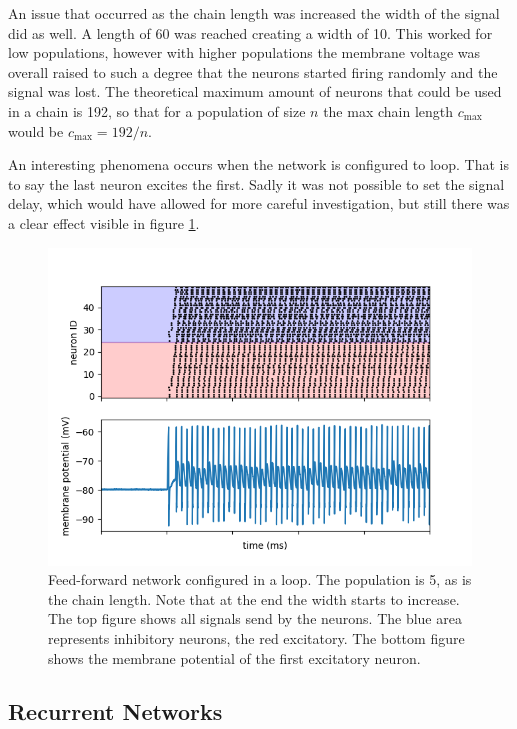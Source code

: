\documentclass[10pt,a4paper]{article}
\begin{document}
An issue that occurred as the chain length was increased the width of the signal
did as well. A length of 60 was reached creating a width of 10. This worked for
low populations, however with higher populations the membrane voltage was
overall raised to such a degree that the neurons started firing randomly and the
signal was lost. The theoretical maximum amount of neurons that could be used in
a chain is 192, so that for a population of size $n$ the max chain length
$c_\text{max}$ would be $c_\text{max} = 192 / n$.

An interesting phenomena occurs when the network is configured to loop. That is
to say the last neuron excites the first. Sadly it was not possible to set the
signal delay, which would have allowed for more careful investigation, but still
there was a clear effect visible in figure \ref{fig:feed-forward-loop}.

\begin{figure}
    \centering
    \includegraphics[width=\textwidth]{figures/feedforward signals loop.png}
    \caption{Feed-forward network configured in a loop. The population is 5, as
        is the chain length. Note that at the end the width starts to increase.
        The top figure shows all signals send by the neurons. The blue area
        represents inhibitory neurons, the red excitatory. The bottom figure
        shows the membrane potential of the first excitatory neuron.}
    \label{fig:feed-forward-loop}
\end{figure}


\subsection{Recurrent Networks}
\end{document}
